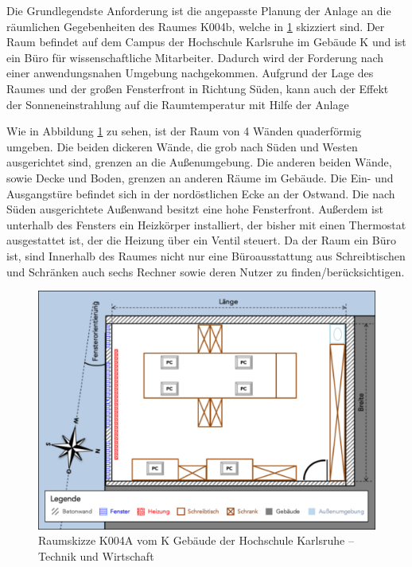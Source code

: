 Die Grundlegendste Anforderung ist die angepasste Planung der Anlage an die räumlichen Gegebenheiten des Raumes K004b, welche in \ref{fig:skizzek004a} skizziert sind. Der Raum befindet auf dem Campus der Hochschule Karlsruhe im Gebäude K und ist ein Büro für wissenschaftliche Mitarbeiter. Dadurch wird der Forderung nach einer anwendungsnahen Umgebung nachgekommen. Aufgrund der Lage des Raumes und der großen Fensterfront in Richtung Süden, kann auch der Effekt der Sonneneinstrahlung auf die Raumtemperatur mit Hilfe der Anlage 

 Wie in Abbildung \ref{fig:skizzek004a} zu sehen, ist der Raum von 4 Wänden quaderförmig umgeben. Die beiden dickeren Wände, die grob nach Süden und Westen ausgerichtet sind, grenzen an die Außenumgebung. Die anderen beiden Wände, sowie Decke und Boden, grenzen an anderen Räume im Gebäude. Die Ein- und Ausgangstüre befindet sich in der nordöstlichen Ecke an der Ostwand. Die nach Süden ausgerichtete Außenwand besitzt eine hohe Fensterfront. Außerdem ist unterhalb des Fensters ein Heizkörper installiert, der bisher mit einen Thermostat ausgestattet ist, der die Heizung über ein Ventil  steuert.
Da der Raum ein Büro ist, sind Innerhalb des Raumes nicht nur eine Büroausstattung aus Schreibtischen und Schränken auch sechs Rechner sowie deren Nutzer zu finden/berücksichtigen.

\begin{figure}
\centering
\includegraphics[width=\textwidth]{abbildungen/20160102_k004a}
\caption[Raumskizze K004A vom K Gebäude der Hochschule Karlsruhe -- Technik und Wirtschaft]{Raumskizze K004A vom K Gebäude der Hochschule Karlsruhe -- Technik und Wirtschaft}
\label{fig:skizzek004a}
\end{figure}

